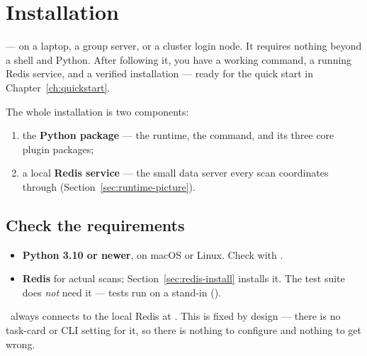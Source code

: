 \chapter{Installation}
\label{ch:installation}

 --- on a laptop, a group
server, or a cluster login node. It requires nothing beyond a shell and Python. After
following it, you have a working  command, a running Redis service, and a
verified installation --- ready for the quick start in Chapter~\ref{ch:quickstart}.

The whole installation is two components:

\begin{enumerate}
  \item the \textbf{Python package}  --- the runtime, the
         command, and its three core plugin
        packages;
  \item a local \textbf{Redis service} --- the small data server every scan
        coordinates through (Section~\ref{sec:runtime-picture}).
\end{enumerate}

\section{Check the requirements}
\label{sec:requirements}

\begin{itemize}
  \item \textbf{Python 3.10 or newer}, on macOS or Linux. Check with
        .
  \item \textbf{Redis} for actual scans; Section~\ref{sec:redis-install} installs it.
        The test suite does \emph{not} need it --- tests run on a stand-in
        ().
\end{itemize}

\begin{jnote}
\Jtwo\ always connects to the local Redis at . This is fixed by
design --- there is no task-card or CLI setting for it, so there is nothing to
configure and nothing to get wrong.
\end{jnote}

